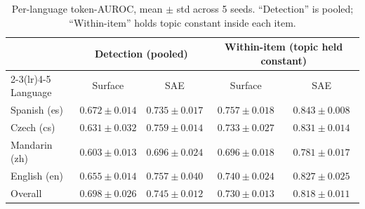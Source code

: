 \documentclass[conference]{IEEEtran}
\begin{document}
\begin{table}[t]
\renewcommand{\arraystretch}{1.3}
\caption{Per-language token-AUROC, mean $\pm$ std across 5 seeds.
``Detection'' is pooled; ``Within-item'' holds topic constant inside each item.}
\label{tab:appendix}
\centering
\begin{tabular}{l cc cc}
\toprule
& \multicolumn{2}{c}{Detection (pooled)} & \multicolumn{2}{c}{Within-item (topic held constant)} \\
\cmidrule(lr){2-3}\cmidrule(lr){4-5}
Language & Surface & SAE & Surface & SAE \\
\midrule
Spanish (es)  & $0.672 \pm 0.014$ & $0.735 \pm 0.017$ & $0.757 \pm 0.018$ & $0.843 \pm 0.008$ \\
Czech (cs)    & $0.631 \pm 0.032$ & $0.759 \pm 0.014$ & $0.733 \pm 0.027$ & $0.831 \pm 0.014$ \\
Mandarin (zh) & $0.603 \pm 0.013$ & $0.696 \pm 0.024$ & $0.696 \pm 0.018$ & $0.781 \pm 0.017$ \\
English (en)  & $0.655 \pm 0.014$ & $0.757 \pm 0.040$ & $0.740 \pm 0.024$ & $0.827 \pm 0.025$ \\
\midrule
Overall       & $0.698 \pm 0.026$ & $0.745 \pm 0.012$ & $0.730 \pm 0.013$ & $0.818 \pm 0.011$ \\
\bottomrule
\end{tabular}
\end{table}
\end{document}
